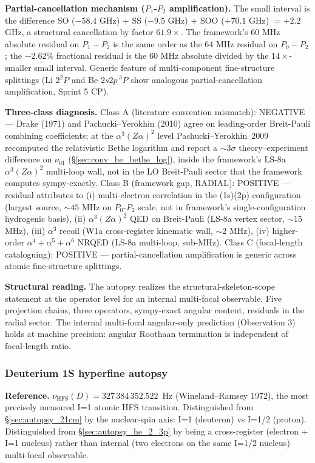 \documentclass[11pt]{article}
\begin{document}
\textbf{Partial-cancellation mechanism ($P_1$-$P_2$ amplification).}
The small interval is the difference SO ($-58.4$ GHz) $+$ SS
($-9.5$ GHz) $+$ SOO ($+70.1$ GHz) $= +2.2$ GHz, a structural
cancellation by factor $61.9\times$.  The framework's $60$ MHz
absolute residual on $P_1 - P_2$ is the same order as the $64$ MHz
residual on $P_0 - P_2$; the $-2.62\%$ fractional residual is the
$60$ MHz absolute divided by the $14\times$-smaller small interval.
Generic feature of multi-component fine-structure splittings (Li
$2{}^2P$ and Be $2s2p\,{}^3P$ show analogous partial-cancellation
amplification, Sprint 5 CP).

\textbf{Three-class diagnosis.}
Class A (literature convention mismatch): NEGATIVE --- Drake (1971) and
Pachucki--Yerokhin (2010) agree on leading-order Breit-Pauli combining
coefficients; at the $\alpha^3(Z\alpha)^2$ level Pachucki--Yerokhin~2009
recomputed the relativistic Bethe logarithm and report a $\sim3\sigma$
theory--experiment difference on $\nu_{01}$
(\S\ref{sec:conv_he_bethe_log}), inside the framework's LS-8a
$\alpha^3(Z\alpha)^2$ multi-loop wall, not in the LO Breit-Pauli sector
that the framework computes sympy-exactly.  Class B (framework gap,
RADIAL): POSITIVE --- residual
attributes to (i) multi-electron correlation in the (1s)(2p)
configuration (largest source, $\sim 45$ MHz on $P_0$-$P_2$ scale,
not in framework's single-configuration hydrogenic basis), (ii)
$\alpha^3(Z\alpha)^2$ QED on Breit-Pauli (LS-8a vertex sector,
$\sim 15$ MHz), (iii) $\alpha^3$ recoil (W1a cross-register
kinematic wall, $\sim 2$ MHz), (iv) higher-order $\alpha^4 + \alpha^5
+ \alpha^6$ NRQED (LS-8a multi-loop, sub-MHz).  Class C (focal-length
cataloguing): POSITIVE --- partial-cancellation amplification is
generic across atomic fine-structure splittings.

\textbf{Structural reading.}  The autopsy realizes the
structural-skeleton-scope statement at the operator level for an
internal multi-focal observable.  Five projection chains, three
operators, sympy-exact angular content, residuals in the radial
sector.
The internal multi-focal angular-only prediction (Observation 3)
holds at machine precision: angular Roothaan termination is
independent of focal-length ratio.

\subsubsection{Deuterium 1S hyperfine autopsy}
\label{sec:autopsy_d_hfs}

\textbf{Reference.} $\nu_\text{HFS}(D) = 327\,384\,352.522$~Hz
(Wineland--Ramsey 1972), the most precisely measured I=1 atomic HFS
transition.  Distinguished from \S\ref{sec:autopsy_21cm} by the
nuclear-spin axis: I=1 (deuteron) vs I=1/2 (proton).  Distinguished
from \S\ref{sec:autopsy_he_2_3p} by being a cross-register
(electron $+$ I=1 nucleus) rather than internal (two electrons on
the same I=1/2 nucleus) multi-focal observable.
\end{document}
